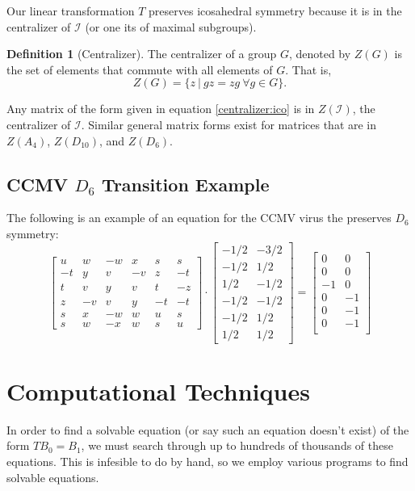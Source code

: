 \documentclass[a4paper,10pt]{article}
\theoremstyle{plain}
\theoremstyle{definition}
\newtheorem{Definition}[Theorem]{Definition}
\theoremstyle{remark}
\begin{document}
Our linear transformation \(T\) preserves icosahedral symmetry because it is in the centralizer of \(\mathcal{I}\) (or one its of maximal subgroups).
\begin{Definition}[Centralizer]
    The centralizer of a group \(G\), denoted by \(Z(G)\) is the set of elements that commute with all elements of \(G\).
    That is, \[Z(G) = \{z\ |\ gz = zg\ \forall g \in G\}.\]
\end{Definition}
Any matrix of the form given in equation \ref{centralizer:ico} is in \(Z(\mathcal{I})\), the centralizer of \(\mathcal{I}\).
Similar general matrix forms exist for matrices that are in \(Z(A_4)\), \(Z(D_{10})\), and \(Z(D_6)\). \cite{indelicatoetal2012}

\subsection{CCMV \(D_6\) Transition Example}
The following is an example of an equation for the CCMV virus the preserves \(D_6\) symmetry:
\[\begin{bmatrix}
    u  & w  & -w & x  & s  & s  \\
    -t & y  & v  & -v & z  & -t \\
    t  & v  & y  & v  & t  & -z \\
    z  & -v & v  & y  & -t & -t \\
    s  & x  & -w & w  & u  & s  \\
    s  & w  & -x & w  & s  & u 
\end{bmatrix}
\cdot
\begin{bmatrix}
-1/2 & -3/2 \\
-1/2 & 1/2 \\
1/2 & -1/2 \\
-1/2 & -1/2 \\
-1/2 & 1/2 \\
1/2 & 1/2
\end{bmatrix} 
=
\begin{bmatrix}
0 & 0 \\
0 & 0 \\
-1 & 0 \\
0 & -1 \\
0 & -1 \\
0 & -1 \\
\end{bmatrix}\]

\section{Computational Techniques}
In order to find a solvable equation (or say such an equation doesn't exist) of the form \(TB_0 = B_1\), we must search through up to hundreds of thousands of these equations.
This is infesible to do by hand, so we employ various programs to find solvable equations.
\end{document}
